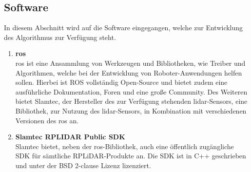 \subsection{Software}
In diesem Abschnitt wird auf die Software eingegangen, welche zur Entwicklung des Algorithmus zur Verfügung steht.

\begin{enumerate}
    \item \textbf{\acf{ros}} \\
    \ac{ros} ist eine Ansammlung von Werkzeugen und Bibliotheken, wie Treiber und Algorithmen, welche bei der Entwicklung von Roboter-Anwendungen helfen sollen. Hierbei ist ROS vollständig Open-Source und bietet zudem eine ausführliche Dokumentation, Foren und eine große Community. \cite{Ros2024}
    Des Weiteren bietet Slamtec, der Hersteller des zur Verfügung stehenden \ac{lidar}-Sensors, eine Bibliothek, zur Nutzung des \ac{lidar}-Sensors, in Kombination mit verschiedenen Versionen des \ac{ros} an. \cite{RplidarRos2023}

    \item \textbf{Slamtec RPLIDAR Public SDK} \\
    Slamtec bietet, neben der \ac{ros}-Bibliothek, auch eine öffentlich zugängliche SDK für sämtliche RPLiDAR-Produkte an. Die SDK ist in C++ geschrieben und unter der BSD 2-clause Lizenz lizenziert. \cite{RplidarSDK2023}

\end{enumerate}

\newpage
